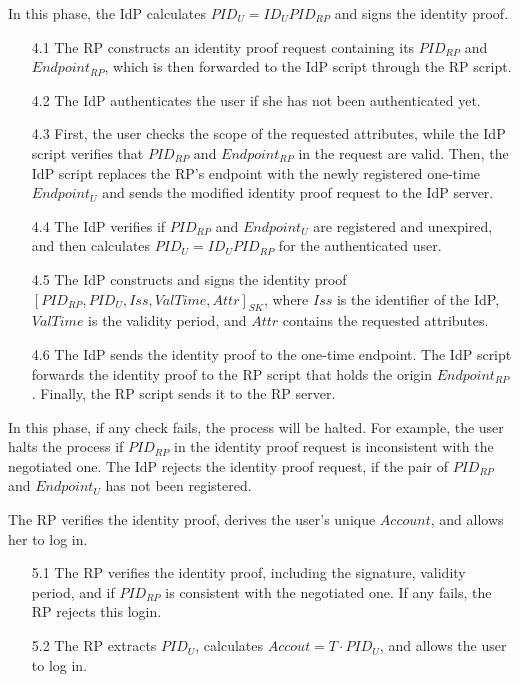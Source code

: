 In this phase, the IdP calculates $PID_U = {ID_U}{PID_{RP}}$ and signs the identity proof. %
\vspace{-\topsep}
\begin{itemize}
\item[4.1] The RP constructs an identity proof request containing its $PID_{RP}$ and $Endpoint_{RP}$, which is then forwarded to the IdP script through the RP script.
\vspace{-\topsep}
\item[4.2] The IdP authenticates the user if she has not been authenticated yet.
\vspace{-\topsep}
\item[4.3] First, the user checks the scope of the requested attributes, while the IdP script verifies that $PID_{RP}$ and $Endpoint_{RP}$ in the request are valid. Then, the IdP script replaces the RP's endpoint with the newly registered one-time $Endpoint_U$ and sends the modified identity proof request to the IdP server.
\vspace{-\topsep}
\item [4.4] The IdP verifies if $PID_{RP}$ and $Endpoint_U$ are registered and unexpired, and then calculates $PID_U = {ID_U}{PID_{RP}}$ for the authenticated user.
\vspace{-\topsep}
\item[4.5] The IdP constructs and signs the identity proof $[PID_{RP}, PID_U, Iss, ValTime, Attr]_{SK}$, where $Iss$ is the identifier of the IdP, $ValTime$ is the validity period, and $Attr$ contains the requested attributes.
\vspace{-\topsep}
\item[4.6] The IdP sends the identity proof to the one-time endpoint. The IdP script forwards the identity proof to the RP script that holds the origin $Endpoint_{RP}$. Finally, the RP script sends it to the RP server.
\end{itemize}
\vspace{-\topsep}
In this phase, if any check fails, the process will be halted. For example, the user halts the process if $PID_{RP}$ in the identity proof request is inconsistent with  the negotiated one. The IdP rejects the identity proof request, if the pair of $PID_{RP}$ and $Endpoint_U$ has not been registered.

The RP verifies the identity proof, derives the user's unique $Account$, and allows her to log in.
\vspace{-\topsep}
\begin{itemize}
\item[5.1] The RP verifies the identity proof, including the signature, validity period, and if $PID_{RP}$ is consistent with the negotiated one. If any fails, the RP rejects this login.
\vspace{-\topsep}
\item [5.2] The RP extracts $PID_U$, calculates $Accout = T \cdot {PID_U}$, and allows the user to log in.
\end{itemize}
\vspace{-\topsep}


